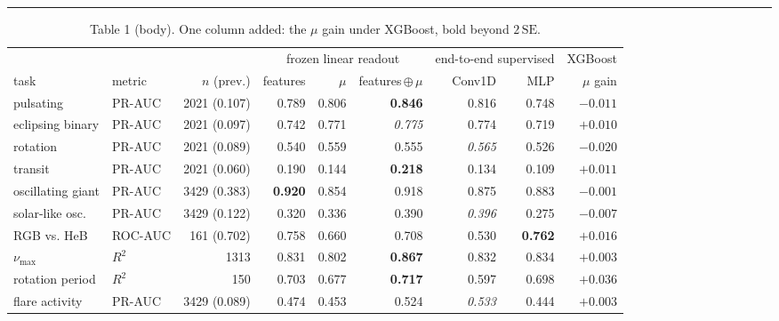 \documentclass{article}
\begin{document}
\noindent\rule{\linewidth}{0.4pt}\par{}
\begin{table}[h]\caption{Table 1 (body). One column added: the $\mu$ gain under XGBoost, bold beyond $2\,\mathrm{SE}$.}
\centering\scriptsize
\begin{tabular}{llrrrrrrr}
\toprule
 & & & \multicolumn{3}{c}{frozen linear readout} & \multicolumn{2}{c}{end-to-end supervised} & XGBoost \\
\cmidrule(lr){4-6}\cmidrule(lr){7-8}\cmidrule(lr){9-9}
task & metric & $n$ (prev.) & features & $\mu$ & features\,$\oplus$\,$\mu$ & Conv1D & MLP & $\mu$ gain \\
\midrule
pulsating & PR-AUC & 2021 (0.107) & 0.789 & 0.806 & \textbf{0.846} & 0.816 & 0.748 & $-0.011$ \\
eclipsing binary & PR-AUC & 2021 (0.097) & 0.742 & 0.771 & \textit{0.775} & 0.774 & 0.719 & $\mathbf{+0.010}$ \\
rotation & PR-AUC & 2021 (0.089) & 0.540 & 0.559 & 0.555 & \textit{0.565} & 0.526 & $\mathbf{-0.020}$ \\
transit & PR-AUC & 2021 (0.060) & 0.190 & 0.144 & \textbf{0.218} & 0.134 & 0.109 & $+0.011$ \\
oscillating giant & PR-AUC & 3429 (0.383) & \textbf{0.920} & 0.854 & 0.918 & 0.875 & 0.883 & $-0.001$ \\
solar-like osc. & PR-AUC & 3429 (0.122) & 0.320 & 0.336 & 0.390 & \textit{0.396} & 0.275 & $-0.007$ \\
RGB vs. HeB & ROC-AUC & 161 (0.702) & 0.758 & 0.660 & 0.708 & 0.530 & \textbf{0.762} & $\mathbf{+0.016}$ \\
$\nu_{\max}$ & $R^2$ & 1313 & 0.831 & 0.802 & \textbf{0.867} & 0.832 & 0.834 & $\mathbf{+0.003}$ \\
rotation period & $R^2$ & 150 & 0.703 & 0.677 & \textbf{0.717} & 0.597 & 0.698 & $\mathbf{+0.036}$ \\
flare activity & PR-AUC & 3429 (0.089) & 0.474 & 0.453 & 0.524 & \textit{0.533} & 0.444 & $+0.003$ \\
\bottomrule
\end{tabular}
\end{table}
\end{document}
